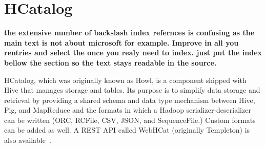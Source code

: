 \section{HCatalog}

{\bf the extensive number of backslash index refernces is confusing as the main
  text is not about microsoft for example. Improve in all you rentries
and select the once you realy need to index. just put the index bellow
the section so the text stays readable in the source.}

HCatalog, which was originally known as Howl, is a component shipped
with Hive that manages storage and tables. Its purpose is to simplify
data storage and retrieval by providing a shared schema and data type
mechanism between Hive, Pig, and MapReduce and the formats
in which a Hadoop serializer-deserializer can be written (ORC,
RCFile, CSV, JSON, and SequenceFile.) Custom formats can be added as
well. A REST API called WebHCat (originally Templeton) is also
available~\cite{hid-sp18-419-www-hc-wiki}.
